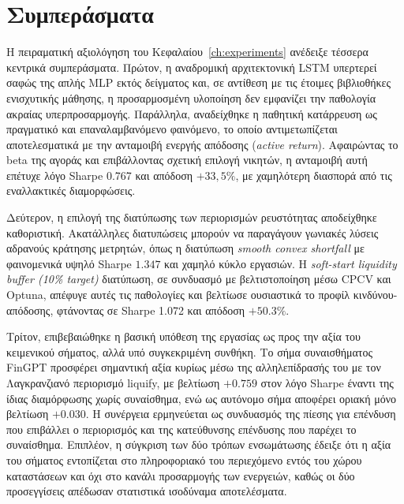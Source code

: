 
\chapter{Συμπεράσματα}
\label{ch:conclusions}

Η πειραματική αξιολόγηση του Κεφαλαίου~\ref{ch:experiments} ανέδειξε τέσσερα κεντρικά
συμπεράσματα. Πρώτον, η αναδρομική αρχιτεκτονική LSTM υπερτερεί σαφώς της απλής MLP εκτός
δείγματος και, σε αντίθεση με τις έτοιμες βιβλιοθήκες ενισχυτικής μάθησης, η προσαρμοσμένη
υλοποίηση δεν εμφανίζει την παθολογία ακραίας υπερπροσαρμογής. Παράλληλα, αναδείχθηκε η
παθητική κατάρρευση ως πραγματικό και επαναλαμβανόμενο φαινόμενο, το οποίο αντιμετωπίζεται
αποτελεσματικά με την ανταμοιβή ενεργής απόδοσης (\textit{active return}). Αφαιρώντας το beta της αγοράς και
επιβάλλοντας σχετική επιλογή νικητών, η ανταμοιβή αυτή επέτυχε λόγο Sharpe 0.767 και
απόδοση $+33{,}5\%$, με χαμηλότερη διασπορά από τις εναλλακτικές διαμορφώσεις.

Δεύτερον, η επιλογή της διατύπωσης των περιορισμών ρευστότητας αποδείχθηκε καθοριστική.
Ακατάλληλες διατυπώσεις μπορούν να παραγάγουν γωνιακές λύσεις αδρανούς κράτησης μετρητών,
όπως η διατύπωση \textit{smooth convex shortfall} με φαινομενικά υψηλό Sharpe $1{.}347$ και χαμηλό κύκλο εργασιών. 
Η \textit{soft-start liquidity buffer (10\% target)} διατύπωση, σε συνδυασμό με βελτιστοποίηση μέσω CPCV και Optuna, απέφυγε αυτές τις παθολογίες και βελτίωσε
ουσιαστικά το προφίλ κινδύνου-απόδοσης, φτάνοντας σε Sharpe 1.072 και απόδοση $+50{.}3\%$.

Τρίτον, επιβεβαιώθηκε η βασική υπόθεση της εργασίας ως προς την αξία του κειμενικού σήματος,
αλλά υπό συγκεκριμένη συνθήκη. Το σήμα συναισθήματος FinGPT προσφέρει σημαντική αξία κυρίως
μέσω της αλληλεπίδρασής του με τον Λαγκρανζιανό περιορισμό liquify, με βελτίωση $+0{.}759$
στον λόγο Sharpe έναντι της ίδιας διαμόρφωσης χωρίς συναίσθημα, ενώ ως αυτόνομο σήμα αποφέρει
οριακή μόνο βελτίωση $+0{.}030$. Η συνέργεια ερμηνεύεται ως συνδυασμός της πίεσης για επένδυση
που επιβάλλει ο περιορισμός και της κατεύθυνσης επένδυσης που παρέχει το συναίσθημα. Επιπλέον,
η σύγκριση των δύο τρόπων ενσωμάτωσης έδειξε ότι η αξία του σήματος εντοπίζεται στο
πληροφοριακό του περιεχόμενο εντός του χώρου καταστάσεων και όχι στο κανάλι προσαρμογής των
ενεργειών, καθώς οι δύο προσεγγίσεις απέδωσαν στατιστικά ισοδύναμα αποτελέσματα.

